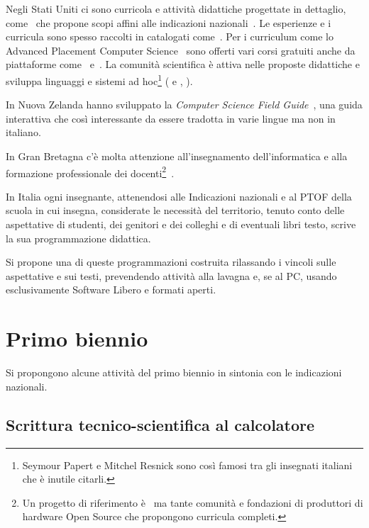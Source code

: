 \documentclass[a4paper]{easychair}
\begin{document}
Negli Stati Uniti ci sono curricola e attività didattiche progettate in
dettaglio, come~\cite{fisler2021evolving} che propone scopi affini
alle indicazioni nazionali~\cite{indicazioniNazionali}.
Le esperienze e i curricula sono spesso raccolti in catalogati come~\cite{cs4all}.
Per i curriculum come lo Advanced Placement Computer Science~\cite{ap-csp}
sono offerti vari corsi gratuiti anche da piattaforme come~\cite{codeorg}
e~\cite{khan-academy}.
La comunità scientifica è attiva nelle proposte didattiche e sviluppa linguaggi
e sistemi ad hoc\footnote{%
Seymour Papert e Mitchel Resnick sono così famosi tra gli insegnati italiani che è inutile citarli.} %
(\cite{abelson1996structure} e \cite{abelson2022structure}, \cite{friedman1995little}).

In Nuova Zelanda hanno sviluppato la \textit{Computer Science Field Guide}~\cite{csfg},
una guida interattiva che così interessante da essere tradotta in varie lingue ma non in italiano.

In Gran Bretagna c'è molta attenzione all'insegnamento dell'informatica
e alla formazione professionale dei docenti\footnote{Un progetto di riferimento è~\cite{nc4ce} ma tante comunità e fondazioni
di produttori di hardware Open Source che propongono curricula completi.
}~\cite{fowler2021england}.

In Italia ogni insegnante, attenendosi alle Indicazioni nazionali e al PTOF
della scuola in cui insegna, considerate le necessità del territorio,
tenuto conto delle aspettative di studenti, dei genitori e dei colleghi e
di eventuali libri testo, 
scrive la sua programmazione didattica.

Si propone una di queste programmazioni costruita rilassando
i vincoli sulle aspettative e sui testi, prevendendo attività
alla lavagna e, se al PC, usando esclusivamente
Software Libero e formati aperti.


\section{Primo biennio}
\label{sec:b1}

Si propongono alcune attività del primo biennio in sintonia con le indicazioni nazionali.

\subsection[Scrittura tecnico-scientifica]{Scrittura tecnico-scientifica al calcolatore} 
\end{document}

